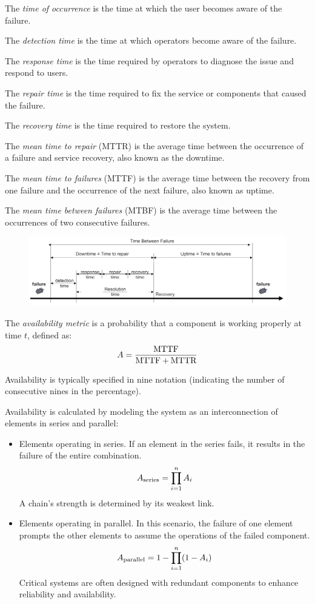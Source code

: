 \begin{definition}
    The \emph{time of occurrence} is the time at which the user becomes aware of the failure. 

    The \emph{detection time} is the time at which operators become aware of the failure. 

    The \emph{response time} is the time required by operators to diagnose the issue and respond to users. 

    The \emph{repair time} is the time required to fix the service or components that caused the failure. 

    The \emph{recovery time} is the time required to restore the system. 

    The \emph{mean time to repair} (MTTR) is the average time between the occurrence of a failure and service recovery, also known as the downtime. 

    The \emph{mean time to failures} (MTTF) is the average time between the recovery from one failure and the occurrence of the next failure, also known as uptime.

    The \emph{mean time between failures} (MTBF) is the average time between the occurrences of two consecutive failures. 
\end{definition}
\begin{figure}[H]
    \centering
    \includegraphics[width=0.75\linewidth]{images/fail.png}
\end{figure}
\begin{definition}
    The \emph{availability metric} is a probability that a component is working properly at time $t$, defined as: 
    \[A=\dfrac{\textnormal{MTTF}}{\textnormal{MTTF}+\textnormal{MTTR}}\]
\end{definition}
Availability is typically specified in nine notation (indicating the number of consecutive nines in the percentage). 

Availability is calculated by modeling the system as an interconnection of elements in series and parallel:
\begin{itemize}
    \item Elements operating in series. 
        If an element in the series fails, it results in the failure of the entire combination.
        \[A_{\textnormal{series}}=\prod_{i=1}^n A_i\]
        A chain's strength is determined by its weakest link.
    \item Elements operating in parallel. 
        In this scenario, the failure of one element prompts the other elements to assume the operations of the failed component.
        \[A_{\textnormal{parallel}}=1-\prod_{i=1}^n (1-A_i)\]
        Critical systems are often designed with redundant components to enhance reliability and availability.
\end{itemize}

